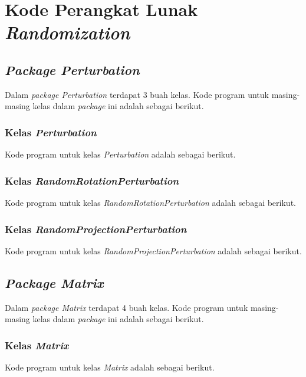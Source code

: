 \chapter{Kode Perangkat Lunak \textit{Randomization}}
\label{lamp:A}

\newcommand{\package}[2]{
	\section{\textit{Package #1}}
	\label{sec:p-#1}

	Dalam \textit{package #1} terdapat #2 buah kelas. Kode program untuk masing-masing kelas dalam \textit{package} ini adalah sebagai berikut.
}

\package{Perturbation}{3}

\subsection{Kelas \textit{Perturbation}}
\label{subsec:c-perturbation}
Kode program untuk kelas \textit{Perturbation} adalah sebagai berikut.


\subsection{Kelas \textit{RandomRotationPerturbation}}
\label{subsec:c-rotation}
Kode program untuk kelas \textit{RandomRotationPerturbation} adalah sebagai berikut.


\subsection{Kelas \textit{RandomProjectionPerturbation}}
\label{subsec:c-projection}
Kode program untuk kelas \textit{RandomProjectionPerturbation} adalah sebagai berikut.


\package{Matrix}{4}

\subsection{Kelas \textit{Matrix}}
\label{subsec:c-matrix}
Kode program untuk kelas \textit{Matrix} adalah sebagai berikut.


